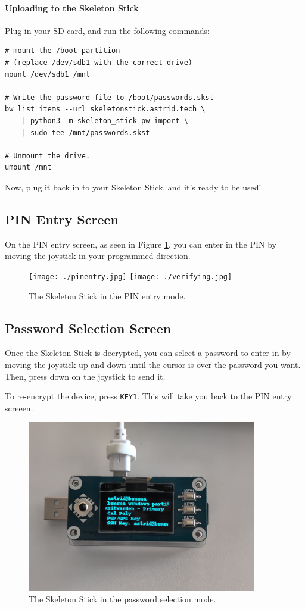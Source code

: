 \documentclass{article}
\begin{document}
\paragraph{Uploading to the Skeleton Stick} Plug in your SD card, and run the following commands:

\begin{verbatim}
# mount the /boot partition
# (replace /dev/sdb1 with the correct drive)
mount /dev/sdb1 /mnt

# Write the password file to /boot/passwords.skst
bw list items --url skeletonstick.astrid.tech \
    | python3 -m skeleton_stick pw-import \
    | sudo tee /mnt/passwords.skst

# Unmount the drive.
umount /mnt
\end{verbatim}

Now, plug it back in to your Skeleton Stick, and it's ready to be used!

\subsection{PIN Entry Screen}

On the PIN entry screen, as seen in Figure \ref{fig:pinentry}, you can enter in the PIN by moving the joystick in your programmed direction.

\begin{figure}
    \centering
    \texttt{[image: ./pinentry.jpg]}
    \texttt{[image: ./verifying.jpg]}

    \caption{The Skeleton Stick in the PIN entry mode.}
    \label{fig:pinentry}
\end{figure}

\subsection{Password Selection Screen}

Once the Skeleton Stick is decrypted, you can select a password to enter in by moving the joystick up and down until the cursor is over the password you want. Then, press down on the joystick to send it.

To re-encrypt the device, press \texttt{KEY1}. This will take you back to the PIN entry screeen.

\begin{figure}
    \centering
    \includegraphics[width=10cm]{./unlocked.jpg}
    \caption{The Skeleton Stick in the password selection mode.}
    \label{fig:pwselect}
\end{figure}
\end{document}
